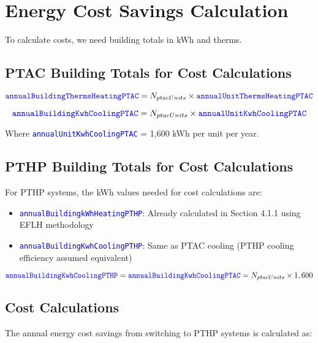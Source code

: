\documentclass{article}
\newcommand{\code}[1]{\textcolor{blue}{\texttt{#1}}}
\begin{document}
\section{Energy Cost Savings Calculation}

To calculate costs, we need building totals in kWh and therms.

\subsection{PTAC Building Totals for Cost Calculations}

\begin{equation}
\code{annualBuildingThermsHeatingPTAC} = N_{ptacUnits} \times \code{annualUnitThermsHeatingPTAC}
\end{equation}

\begin{equation}
\code{annualBuildingKwhCoolingPTAC} = N_{ptacUnits} \times \code{annualUnitKwhCoolingPTAC}
\end{equation}

Where \code{annualUnitKwhCoolingPTAC} = 1,600 kWh per unit per year.

\subsection{PTHP Building Totals for Cost Calculations}

For PTHP systems, the kWh values needed for cost calculations are:

\begin{itemize}
    \item \code{annualBuildingkWhHeatingPTHP}: Already calculated in Section 4.1.1 using EFLH methodology
    \item \code{annualBuildingKwhCoolingPTHP}: Same as PTAC cooling (PTHP cooling efficiency assumed equivalent)
\end{itemize}

\begin{equation}
\code{annualBuildingKwhCoolingPTHP} = \code{annualBuildingKwhCoolingPTAC} = N_{ptacUnits} \times 1,600
\end{equation}

\subsection{Cost Calculations}

The annual energy cost savings from switching to PTHP systems is calculated as:
\end{document}
